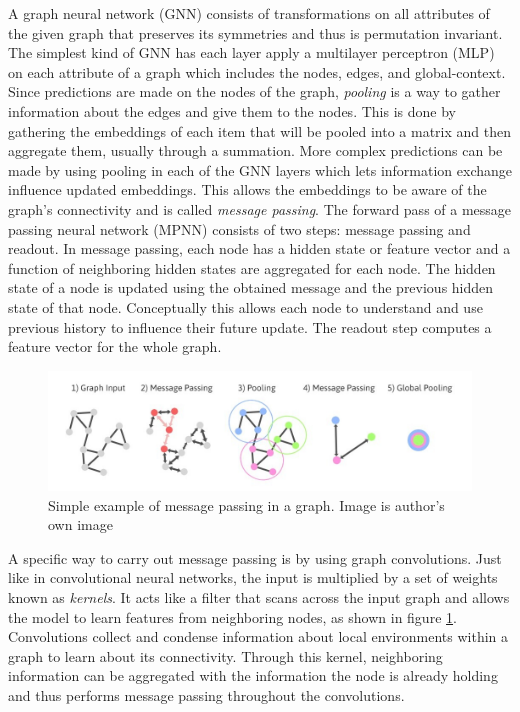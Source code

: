 \documentclass[12pt, abstract = true]{scrartcl}
\begin{document}
A graph neural network (GNN) consists of transformations on all attributes of the given graph 
that preserves its symmetries and thus is permutation invariant. The simplest kind of GNN has 
each layer apply a multilayer perceptron (MLP) on each attribute of a graph which includes the
nodes, edges, and global-context. Since predictions are made on the nodes of the graph, \emph{pooling} 
is a way to gather information about the edges and give them to the nodes. This is done by 
gathering the embeddings of each item that will be pooled into a matrix and then aggregate them, 
usually through a summation. More complex predictions can be made by using pooling 
in each of the GNN layers which lets information exchange influence updated embeddings. This 
allows the embeddings to be aware of the graph's connectivity and is called \emph{message passing}. 
The forward pass of a message passing neural network (MPNN) consists of two steps: message passing 
and readout. In message passing, each node has a hidden state or feature vector and a function of 
neighboring hidden states are aggregated for each node. The hidden state of a node is updated using 
the obtained message and the previous hidden state of that node. Conceptually this allows each node 
to understand and use previous history to influence their future update. The readout step computes 
a feature vector for the whole graph.

\begin{figure}
  \centering
  \includegraphics[scale=1.75]{mpnn.jpeg}
  
  \caption{Simple example of message passing in a graph. Image is author's own image}\label{fig:mpnn}
\end{figure}

A specific way to carry out message passing is by using graph convolutions. Just like in convolutional 
neural networks, the input is multiplied by a set of weights known as \emph{kernels}. It acts like a 
filter that scans across the input graph and allows the model to learn features from neighboring nodes, as shown in figure \ref{fig:mpnn}.
Convolutions collect and condense information about local environments within a graph to learn about 
its connectivity. Through this kernel, neighboring information can be aggregated with the information 
the node is already holding and thus performs message passing throughout the convolutions.
\end{document}
